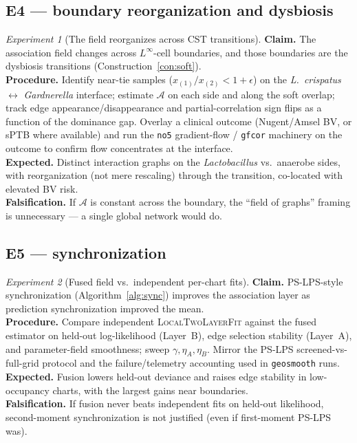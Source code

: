 \documentclass[11pt]{article}
\theoremstyle{definition}
\theoremstyle{plain}
\theoremstyle{remark}
\newtheorem{experiment}{Experiment}
\newcommand{\Linf}{L^{\infty}}
\newcommand{\1}{\mathbf{1}}
\newcommand{\Field}{\mathcal{A}}
\begin{document}
\subsection{E4 --- boundary reorganization and dysbiosis}
\begin{experiment}[The field reorganizes across CST transitions]\label{exp:boundary}
\textbf{Claim.} The association field changes across $\Linf$-cell boundaries, and
those boundaries are the dysbiosis transitions (Construction~\ref{con:soft}).\\
\textbf{Procedure.} Identify near-tie samples
($x_{(1)}/x_{(2)}<1+\epsilon$) on the \emph{L.\ crispatus}$\leftrightarrow$%
\emph{Gardnerella} interface; estimate $\Field$ on each side and along the soft
overlap; track edge appearance/disappearance and partial-correlation sign flips
as a function of the dominance gap. Overlay a clinical outcome (Nugent/Amsel BV,
or sPTB where available) and run the \texttt{no5} gradient-flow / \texttt{gfcor}
machinery on the outcome to confirm flow concentrates at the interface.\\
\textbf{Expected.} Distinct interaction graphs on the \emph{Lactobacillus} vs.\
anaerobe sides, with reorganization (not mere rescaling) through the transition,
co-located with elevated BV risk.\\
\textbf{Falsification.} If $\Field$ is constant across the boundary, the
``field of graphs'' framing is unnecessary --- a single global network would do.
\end{experiment}

\subsection{E5 --- synchronization}
\begin{experiment}[Fused field vs.\ independent per-chart fits]\label{exp:sync}
\textbf{Claim.} PS-LPS-style synchronization (Algorithm~\ref{alg:sync}) improves
the association layer as prediction synchronization improved the mean.\\
\textbf{Procedure.} Compare independent \textsc{LocalTwoLayerFit} against the
fused estimator on held-out log-likelihood (Layer~B), edge selection stability
(Layer~A), and parameter-field smoothness; sweep $\gamma,\eta_A,\eta_B$. Mirror
the PS-LPS screened-vs-full-grid protocol and the failure/telemetry accounting
used in \texttt{geosmooth} runs.\\
\textbf{Expected.} Fusion lowers held-out deviance and raises edge stability in
low-occupancy charts, with the largest gains near boundaries.\\
\textbf{Falsification.} If fusion never beats independent fits on held-out
likelihood, second-moment synchronization is not justified (even if first-moment
PS-LPS was).
\end{experiment}
\end{document}
